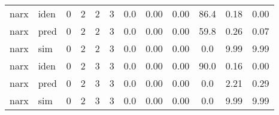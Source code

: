 \begin{center}
\begin{longtable}{ll|cccc|ccc|ccc}
 \hline 
narx & iden & 0 & 2 & 2 & 3 & 0.0 & 0.00 & 0.00 & 86.4 & 0.18 & 0.00 \\ 
narx & pred & 0 & 2 & 2 & 3 & 0.0 & 0.00 & 0.00 & 59.8 & 0.26 & 0.07 \\ 
narx & sim & 0 & 2 & 2 & 3 & 0.0 & 0.00 & 0.00 & 0.0 & 9.99 & 9.99 \\ 
 \hline 
narx & iden & 0 & 2 & 3 & 3 & 0.0 & 0.00 & 0.00 & 90.0 & 0.16 & 0.00 \\ 
narx & pred & 0 & 2 & 3 & 3 & 0.0 & 0.00 & 0.00 & 0.0 & 2.21 & 0.29 \\ 
narx & sim & 0 & 2 & 3 & 3 & 0.0 & 0.00 & 0.00 & 0.0 & 9.99 & 9.99 \\ 
 \hline 
\end{longtable} 
\end{center}